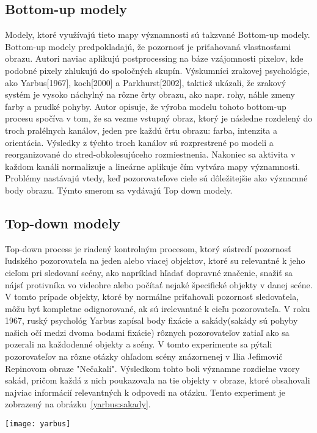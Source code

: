 \documentclass[10pt,twoside,slovak,a4paper]{article}
\begin{document}
\subsection{Bottom-up modely} \label{ina}
Modely, ktoré využívajú tieto mapy významnosti sú takzvané Bottom-up modely. Bottom-up modely predpokladajú, že pozornosť je priťahovaná vlastnosťami obrazu. Autori\cite{bottom} naviac aplikujú postprocessing na báze vzájomnosti pixelov, kde podobné pixely zhlukujú do spoločných skupín. Výskumníci zrakovej psychológie, ako Yarbus[1967], koch[2000] a Parkhurst[2002], taktiež ukázali, že zrakový systém je vysoko náchylný na rôzne črty obrazu, ako napr. rohy, náhle zmeny farby a prudké pohyby. Autor\cite{saliency:vytvar} opisuje, že výroba modelu tohoto bottom-up procesu spočíva v tom, že sa vezme vstupný obraz, ktorý je následne rozdelený do troch pralélnych kanálov, jeden pre každú črtu obrazu: farba, intenzita a orientácia. Výsledky z týchto troch kanálov sú rozprestrené po modeli a reorganizované do stred-obkolesujúceho rozmiestnenia. Nakoniec sa aktivita v každom kanáli normalizuje a lineárne aplikuje čím vytvára mapy významnosti. Problémy nastávajú vtedy, keď pozorovateľove ciele sú dôležitejšie ako významné body obrazu. Týmto smerom sa vydávajú Top down modely.    
\subsection{Top-down modely} \label{nejaka}
Top-down process je riadený kontrolným procesom, ktorý sústredí pozornosť ľudského pozorovateľa na jeden alebo viacej objektov, ktoré su relevantné k jeho cieľom pri sledovaní scény, ako napríklad hľadať dopravné značenie, snažiť sa nájsť  protivníka vo videohre alebo počítať nejaké špecifické objekty v danej scéne. V tomto prípade objekty, ktoré by normálne priťahovali pozornosť sledovaťela, môžu byť kompletne odignorované, ak sú irelevantné k cieľu pozorovateľa. V roku 1967, ruský psychológ Yarbus zapísal body fixácie a sakády(sakády sú pohyby našich očí medzi dvoma bodami fixácie) rôznych pozorovateľov zatiaľ ako sa pozerali na každodenné objekty a scény. V tomto experimente sa pýtali pozorovateľov na rôzne otázky ohľadom scény znázornenej v Ilia Jefimovič Repinovom  obraze "Nečakali". Výsledkom tohto boli významne rozdielne vzory sakád, pričom každá z nich poukazovala na tie objekty v obraze, ktoré obsahovali najviac informácií relevantných k odpovedi na otázku. Tento experiment je zobrazený na obrázku~\ref{yarbus:sakady}.
\begin{figure*}[tbh]
\centering
\texttt{[image: yarbus]}
\caption{ Dopad úloh na pohyb očí. Repinov obraz bol pozorovaný subjektami s rozlišnými inštrukciami(obrázky idú v poradí z ľava do prava z hora dole):1. Voľné pozorovanie, 2. Odhadnite ich vek, 3. Zistite čo robili pred tým, ako sa ukázal nečakaný hosť, 4. Zapamätajte si oblečenie, ktoré majú na sebe postavy oblečené, 5. Zapamätajte si pozíciu ľudí a objektov v izbe a 6. Predpovedajte, ako dlho bol nečakaný hosť preč od danej rodiny[Yarbus 1967].}
\label{yarbus:sakady}
\end{figure*}
\end{document}
